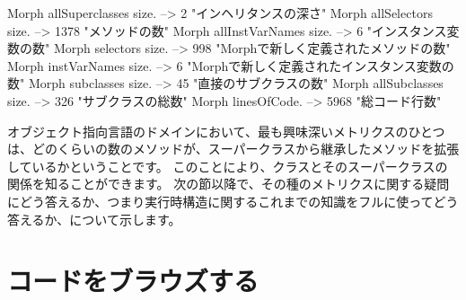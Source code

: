 \documentclass[a4paper,10pt,twoside]{book}
\begin{document}
\begin{code}{}
Morph allSuperclasses size.  -->       2 "インヘリタンスの深さ"
Morph allSelectors size.        --> 1378 "メソッドの数"
Morph allInstVarNames size. -->      6 "インスタンス変数の数"
Morph selectors size.             -->  998 "Morphで新しく定義されたメソッドの数"
Morph instVarNames size.     -->      6 "Morphで新しく定義されたインスタンス変数の数"
Morph subclasses size.          -->    45 "直接のサブクラスの数"
Morph allSubclasses size.      -->  326 "サブクラスの総数"
Morph linesOfCode.               --> 5968 "総コード行数"
\end{code}

オブジェクト指向言語のドメインにおいて、最も興味深いメトリクスのひとつは、どのくらいの数のメソッドが、スーパークラスから継承したメソッドを拡張しているかということです。
このことにより、クラスとそのスーパークラスの関係を知ることができます。
次の節以降で、その種のメトリクスに関する疑問にどう答えるか、つまり実行時構造に関するこれまでの知識をフルに使ってどう答えるか、について示します。%

\section{コードをブラウズする}
\end{document}
